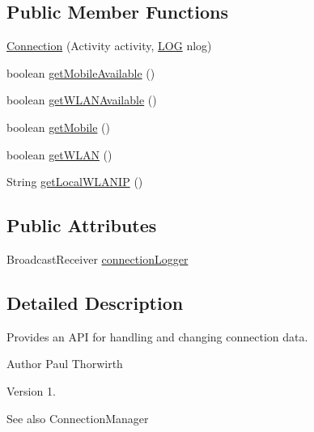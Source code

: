 \subsection*{Public Member Functions}
\begin{DoxyCompactItemize}
\item 
\hyperlink{classswp_1_1tuilmenau_1_1carduinodroid_1_1controller_1_1_connection_a34bd7c0e4a3a6178864064c97c076adf}{Connection} (Activity activity, \hyperlink{classswp_1_1tuilmenau_1_1carduinodroid_1_1model_1_1_l_o_g}{L\+O\+G} nlog)
\item 
boolean \hyperlink{classswp_1_1tuilmenau_1_1carduinodroid_1_1controller_1_1_connection_ae308ed26606956a787a4b61d3fe7e7a0}{get\+Mobile\+Available} ()
\item 
boolean \hyperlink{classswp_1_1tuilmenau_1_1carduinodroid_1_1controller_1_1_connection_a960f3033213736a2ca426a478ad85a3c}{get\+W\+L\+A\+N\+Available} ()
\item 
boolean \hyperlink{classswp_1_1tuilmenau_1_1carduinodroid_1_1controller_1_1_connection_a3ea65267df8d63ec6a67e511067a674c}{get\+Mobile} ()
\item 
boolean \hyperlink{classswp_1_1tuilmenau_1_1carduinodroid_1_1controller_1_1_connection_acc74178e090418a8ae95b2f2840cf06e}{get\+W\+L\+A\+N} ()
\item 
String \hyperlink{classswp_1_1tuilmenau_1_1carduinodroid_1_1controller_1_1_connection_a478434825ab767b5bf14834a1062abb3}{get\+Local\+W\+L\+A\+N\+I\+P} ()
\end{DoxyCompactItemize}
\subsection*{Public Attributes}
\begin{DoxyCompactItemize}
\item 
Broadcast\+Receiver \hyperlink{classswp_1_1tuilmenau_1_1carduinodroid_1_1controller_1_1_connection_ae6c19aae09ad0cc381b2fd17e5f9cf00}{connection\+Logger}
\end{DoxyCompactItemize}


\subsection{Detailed Description}
Provides an A\+P\+I for handling and changing connection data.

\begin{DoxyAuthor}{Author}
Paul Thorwirth 
\end{DoxyAuthor}
\begin{DoxyVersion}{Version}
1. 
\end{DoxyVersion}
\begin{DoxySeeAlso}{See also}
Connection\+Manager 
\end{DoxySeeAlso}



